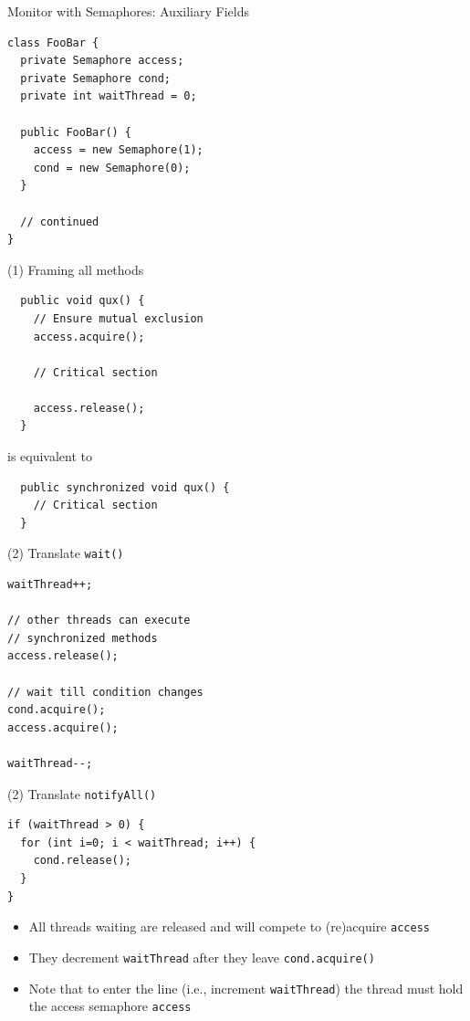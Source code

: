 \begin{frame}[fragile]{Monitor with Semaphores: Auxiliary Fields}
\begin{lstlisting}
class FooBar {
  private Semaphore access;
  private Semaphore cond;
  private int waitThread = 0;

  public FooBar() { 
    access = new Semaphore(1);
    cond = new Semaphore(0);
  }
  
  // continued
}
\end{lstlisting}  
\end{frame}

\begin{frame}[fragile]{(1) Framing all methods}
\begin{lstlisting}
  public void qux() {
    // Ensure mutual exclusion
    access.acquire(); 

    // Critical section

    access.release();
  }
\end{lstlisting}


  is equivalent to


\begin{lstlisting}
  public synchronized void qux() {
    // Critical section
  }
\end{lstlisting}
\end{frame}

\begin{frame}[fragile]{(2) Translate \lstinline!wait()!}
\begin{lstlisting}
waitThread++;

// other threads can execute 
// synchronized methods 
access.release(); 

// wait till condition changes
cond.acquire(); 
access.acquire();

waitThread--;
\end{lstlisting}
\end{frame}

\begin{frame}[fragile]{(2) Translate \lstinline!notifyAll()!}
\begin{lstlisting}
if (waitThread > 0) {
  for (int i=0; i < waitThread; i++) { 
    cond.release();
  }
}	
\end{lstlisting}


  \begin{itemize}
  \item All threads waiting are released and will compete to
    (re)acquire \lstinline!access!
  \item They decrement \lstinline!waitThread! after they leave
    \lstinline!cond.acquire()!
  \item Note that to enter the line (i.e., increment
    \lstinline!waitThread!) the thread must hold the access semaphore
    \lstinline!access!
  \end{itemize}
\end{frame}

